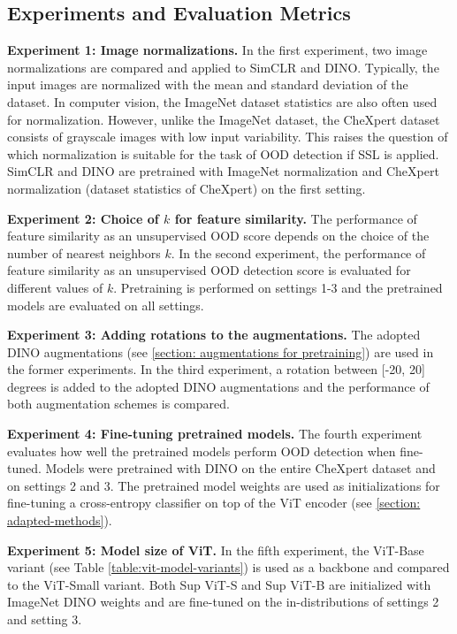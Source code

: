 \subsection{Experiments and Evaluation Metrics}
\label{section: experiments}
\textbf{Experiment 1: Image normalizations.} In the first experiment, two image normalizations are compared and applied to SimCLR and DINO.
Typically, the input images are normalized with the mean and standard deviation of the dataset.
In computer vision, the ImageNet dataset statistics \citep{Deng2009} are also often used for normalization.
However, unlike the ImageNet dataset, the CheXpert dataset consists of grayscale images with low input variability.
This raises the question of which normalization is suitable for the task of OOD detection if SSL is applied.
SimCLR and DINO are pretrained with ImageNet normalization and CheXpert normalization (dataset statistics of CheXpert) on the first setting.
\par
\textbf{Experiment 2: Choice of $k$ for feature similarity.} The performance of feature similarity as an unsupervised OOD score depends on the choice of the number of nearest neighbors $k$.
In the second experiment, the performance of feature similarity as an unsupervised OOD detection score is evaluated for different values of $k$.
Pretraining is performed on settings 1-3 and the pretrained models are evaluated on all settings.
\par
\textbf{Experiment 3: Adding rotations to the augmentations.}
The adopted DINO augmentations (see \ref{section: augmentations for pretraining}) are used in the former experiments.
In the third experiment, a rotation between [-20, 20] degrees is added to the adopted DINO augmentations and the performance of both augmentation schemes is compared.
\par
\textbf{Experiment 4: Fine-tuning pretrained models.}
The fourth experiment evaluates how well the pretrained models perform OOD detection when fine-tuned.
Models were pretrained with DINO on the entire CheXpert dataset and on settings 2 and 3.
The pretrained model weights are used as initializations for fine-tuning a cross-entropy classifier on top of the ViT encoder (see \ref{section: adapted-methods}).
\par
\textbf{Experiment 5: Model size of ViT.}
In the fifth experiment, the ViT-Base variant (see Table \ref{table:vit-model-variants}) is used as a backbone and compared to the ViT-Small variant.
Both Sup ViT-S and Sup ViT-B are initialized with ImageNet DINO weights and are fine-tuned on the in-distributions of settings 2 and setting 3.
